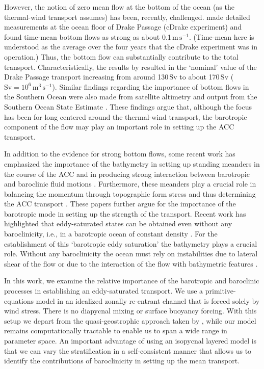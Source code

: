 \documentclass{agujournal2019}
\begin{document}
However, the notion of zero mean flow at the bottom of the ocean (as the thermal-wind transport assumes) has been, recently, challenged.  made detailed measurements at the ocean floor of Drake Passage (cDrake experiment) and found time-mean bottom flows as strong as about 0.1$\,\text{m}\,\text{s}^{-1}$. (Time-mean here is understood as the average over the four years that the cDrake experiment was in operation.) Thus, the bottom flow can substantially contribute to the total transport. Characteristically, the results by  resulted in the `nominal' value of the Drake Passage transport increasing from around 130$\,\text{Sv}$ to about 170$\,\text{Sv}$ ($\text{Sv}=10^6\,\text{m}^3\,\text{s}^{-1}$).  Similar findings regarding the importance of bottom flows in the Southern Ocean were also made from satellite altimetry and output from the Southern Ocean State Estimate \cite{Rintoul-etal-2014, PenaMolino-etal-2014, Masich-etal-2015}. These findings argue that, although the focus has been for long centered around the thermal-wind transport, the barotropic component of the flow may play an important role in setting up the ACC transport. 

In addition to the evidence for strong bottom flows, some recent work has emphasized the importance of the bathymetry in setting up standing meanders in the course of the ACC {\color{black}and in producing strong interaction between barotropic and baroclinic fluid motions} \cite{Youngs-etal-2017, Barthel-etal-2017}. Furthermore, these meanders play a crucial role in balancing the momentum through topographic form stress and thus determining the ACC transport \cite{Thompson-NaveiraGarabato-2014,Katsumata-2017}. These papers further argue for the importance of the barotropic mode in setting up the strength of the transport. Recent work has highlighted that eddy-saturated states can be obtained even without any baroclinicity, i.e., in a barotropic ocean of constant density \cite{Constantinou-Young-2017, Constantinou-2018}. For the establishment of this `barotropic eddy saturation' the bathymetry plays a crucial role. Without any baroclinicity the ocean must rely on instabilities due to lateral shear of the flow or due to the interaction of the flow with bathymetric features \cite{Hart-1979, Charney-Flierl-1980}. 

In this work, we examine the relative importance of the barotropic and baroclinic processes in establishing an eddy-saturated transport. We use a primitive-equations model in an idealized zonally re-entrant channel that is forced solely by wind stress. {\color{black}There is no diapycnal mixing or surface buoyancy forcing.} With this setup we depart from the quasi-geostrophic approach taken by , while our model remains computationally tractable  to enable us to span a wide range in parameter space. An important advantage of using an isopycnal layered model is that we can vary the stratification in a self-consistent manner that allows us to identify the contributions of baroclinicity in setting up the mean transport.
\end{document}

